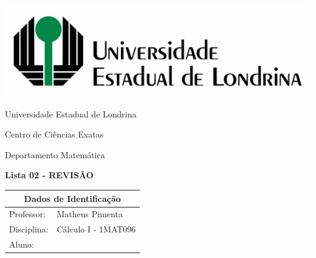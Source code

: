 \documentclass[oneside,a4paper,12pt]{article}
\newcommand{\universidade}{Universidade Estadual de Londrina}
\newcommand{\centro}{Centro de Ciências Exatas}
\newcommand{\departamento}{Departamento Matemática}
\newcommand{\curso}{Física}
\newcommand{\professores}{Matheus Pimenta}
\newcommand{\disciplina}{Cálculo I - 1MAT096}
\begin{document}
	\pagestyle{empty}
	
	\begin{center}
		\includegraphics[width=\linewidth/2]{logo.jpg}%
	 	\vspace{2pt} 	
		
		\universidade
		\par
		\centro
		\par
		\departamento
		\par
		\par
		\vspace{12pt}
		\LARGE \textbf{Lista 02 - REVISÃO}
		
	\end{center}
	
	\vspace{12pt}
	
	\begin{tabular}{ |l|p{12cm}| }
		
		\hline
		\multicolumn{2}{|c|}{\textbf{Dados de Identificação}} \\
		\hline
		Professor:         &    \professores           \\
		\hline
		Disciplina:        &    \disciplina          \\
		\hline
		Aluno:             &                   \\
		\hline
		
	\end{tabular}
	\vspace{6pt}
	
	
	\begin{snugshade}
	\end{snugshade}
\end{document}
